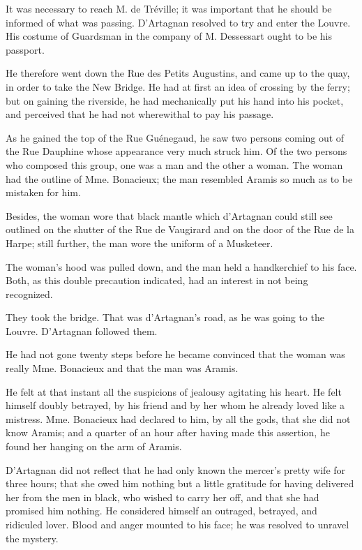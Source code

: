 It was necessary to reach M. de Tréville; it was important that he should be informed of what was passing. D'Artagnan resolved to try and enter the Louvre. His costume of Guardsman in the company of M. Dessessart ought to be his passport. 

He therefore went down the Rue des Petits Augustins, and came up to the quay, in order to take the New Bridge. He had at first an idea of crossing by the ferry; but on gaining the riverside, he had mechanically put his hand into his pocket, and perceived that he had not wherewithal to pay his passage. 

As he gained the top of the Rue Guénegaud, he saw two persons coming out of the Rue Dauphine whose appearance very much struck him. Of the two persons who composed this group, one was a man and the other a woman. The woman had the outline of Mme. Bonacieux; the man resembled Aramis so much as to be mistaken for him. 

Besides, the woman wore that black mantle which d'Artagnan could still see outlined on the shutter of the Rue de Vaugirard and on the door of the Rue de la Harpe; still further, the man wore the uniform of a Musketeer. 

The woman's hood was pulled down, and the man held a handkerchief to his face. Both, as this double precaution indicated, had an interest in not being recognized. 

They took the bridge. That was d'Artagnan's road, as he was going to the Louvre. D'Artagnan followed them. 

He had not gone twenty steps before he became convinced that the woman was really Mme. Bonacieux and that the man was Aramis. 

He felt at that instant all the suspicions of jealousy agitating his heart. He felt himself doubly betrayed, by his friend and by her whom he already loved like a mistress. Mme. Bonacieux had declared to him, by all the gods, that she did not know Aramis; and a quarter of an hour after having made this assertion, he found her hanging on the arm of Aramis. 

D'Artagnan did not reflect that he had only known the mercer's pretty wife for three hours; that she owed him nothing but a little gratitude for having delivered her from the men in black, who wished to carry her off, and that she had promised him nothing. He considered himself an outraged, betrayed, and ridiculed lover. Blood and anger mounted to his face; he was resolved to unravel the mystery. 

